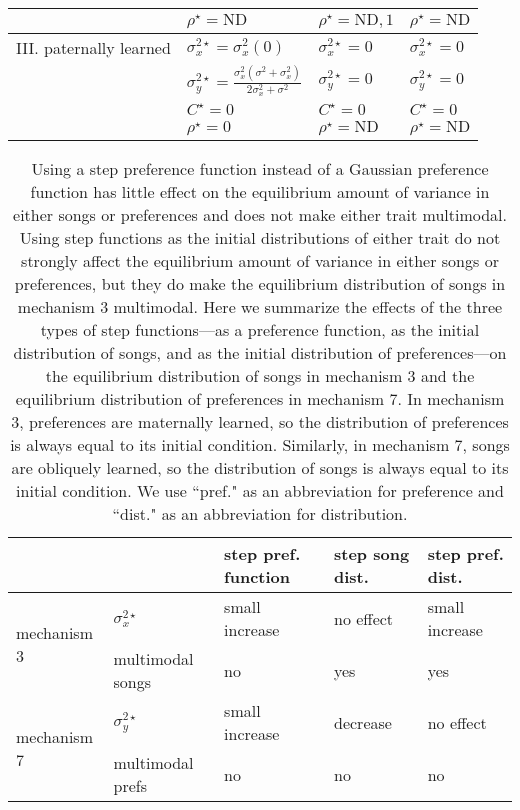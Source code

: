 \documentclass[12pt]{article}
\begin{document}
\begin{table}
\begin{tabular}{|l|l|l|l|}
\\ & $\rho^\star=\text{ND}$ & $\rho^\star=\text{ND},1$ & $\rho^\star=\text{ND}$         
\\\hline III. paternally learned & $\sigma_x^{2\star}=\sigma_x^2(0)$ & $\sigma_x^{2\star}=0$  & $\sigma_x^{2\star}=0$                       
\\  			& $\sigma_y^{2\star}=\frac{\sigma_x^2(\sigma^2+\sigma_x^2)}{2\sigma_x^2+\sigma^2}$	  & $\sigma_y^{2\star}=0$  & $\sigma_y^{2\star}=0$                       
\\ & $ C^\star=0$ & $ C^\star=0$ & $ C^\star=0$
\\ & $\rho^\star=0$ & $\rho^\star=\text{ND}$ & $\rho^\star=\text{ND}$
\\\hline
\end{tabular}
\end{table}

\begin{table}
\caption{\label{step_effects}Using a step preference function instead of a Gaussian preference function has little effect on the equilibrium amount of variance in either songs or preferences and does not make either trait multimodal. Using step functions as the initial distributions of either trait do not strongly affect the equilibrium amount of variance in either songs or preferences, but they do make the equilibrium distribution of songs in mechanism 3 multimodal. Here we summarize the effects of the three types of step functions---as a preference function, as the initial distribution of songs, and as the initial distribution of preferences---on the equilibrium distribution of songs in mechanism 3 and the equilibrium distribution of preferences in mechanism 7. In mechanism 3, preferences are maternally learned, so the distribution of preferences is always equal to its initial condition. Similarly, in mechanism 7, songs are obliquely learned, so the distribution of songs is always equal to its initial condition. We use ``pref." as an abbreviation for preference and ``dist." as an abbreviation for distribution.}
\begin{tabular}{|l|l|l|l|l|}
  \cline{3-5}
\multicolumn{2}{c|}{} & step pref. function  & step song dist. & step pref. dist.
\\\hline \multirow{2}{*}{mechanism 3}&$\sigma_x^{2\star}$& small increase & no effect & small increase \\ 
    \cline{2-5}&multimodal songs & no & yes & yes 
\\\hline \multirow{2}{*}{mechanism 7}
    &$\sigma_y^{2\star}$& small increase & decrease & no effect \\
    \cline{2-5}&multimodal prefs & no & no & no 
\\\hline
\end{tabular}
\end{table}
\end{document}
